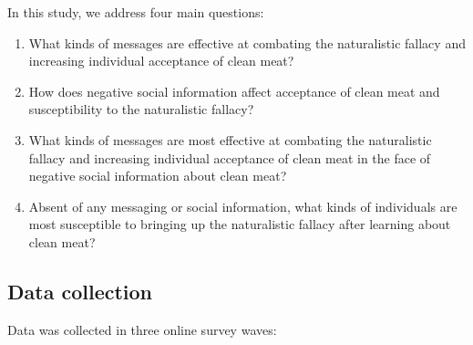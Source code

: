 \documentclass[12pt]{article}
\begin{document}
In this study, we address four main questions:

\begin{enumerate}
    \item What kinds of messages are effective at combating the naturalistic fallacy and increasing individual acceptance of clean meat?
    \item How does negative social information affect acceptance of clean meat and susceptibility to the naturalistic fallacy?
    \item What kinds of messages are most effective at combating the naturalistic fallacy and increasing individual acceptance of clean meat in the face of negative social information about clean meat?
    \item Absent of any messaging or social information, what kinds of individuals are most susceptible to bringing up the naturalistic fallacy after learning about clean meat?
\end{enumerate}

\subsection{Data collection}

Data was collected in three online survey waves:
\end{document}
